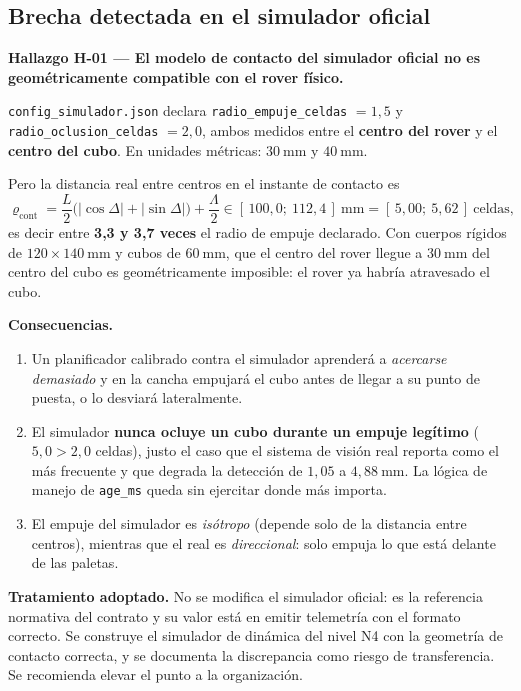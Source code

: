 \documentclass[11pt,a4paper]{article}
\begin{document}
\subsection{Brecha detectada en el simulador oficial}
\label{sec:brecha}

\begin{tcolorbox}[colback=black!5,colframe=black!65,boxrule=0.7pt,arc=1pt]
\textbf{Hallazgo H-01 --- El modelo de contacto del simulador oficial no es
geométricamente compatible con el rover físico.}

\medskip
\texttt{config\_simulador.json} declara \texttt{radio\_empuje\_celdas} $=1{,}5$ y
\texttt{radio\_oclusion\_celdas} $=2{,}0$, ambos medidos entre el \textbf{centro del
rover} y el \textbf{centro del cubo}. En unidades métricas: $30\ \mathrm{mm}$ y
$40\ \mathrm{mm}$.

Pero la distancia real entre centros en el instante de contacto es
\[
  \varrho_{\mathrm{cont}} = \frac{L}{2}\big(|\cos\Delta|+|\sin\Delta|\big) + \frac{\Lambda}{2}
  \in [\,100{,}0;\ 112{,}4\,]\ \mathrm{mm} = [\,5{,}00;\ 5{,}62\,]\ \text{celdas},
\]
es decir entre \textbf{3,3 y 3,7 veces} el radio de empuje declarado. Con cuerpos
rígidos de $120\times140\ \mathrm{mm}$ y cubos de $60\ \mathrm{mm}$, que el centro del
rover llegue a $30\ \mathrm{mm}$ del centro del cubo es geométricamente imposible: el
rover ya habría atravesado el cubo.

\medskip
\textbf{Consecuencias.}
\begin{enumerate}[label=(\alph*),leftmargin=2em,itemsep=1pt]
\item Un planificador calibrado contra el simulador aprenderá a \emph{acercarse
      demasiado} y en la cancha empujará el cubo antes de llegar a su punto de puesta,
      o lo desviará lateralmente.
\item El simulador \textbf{nunca ocluye un cubo durante un empuje legítimo}
      ($5{,}0 > 2{,}0$ celdas), justo el caso que el sistema de visión real reporta
      como el más frecuente y que degrada la detección de $1{,}05$ a
      $4{,}88\ \mathrm{mm}$. La lógica de manejo de \texttt{age\_ms} queda sin ejercitar
      donde más importa.
\item El empuje del simulador es \emph{isótropo} (depende solo de la distancia entre
      centros), mientras que el real es \emph{direccional}: solo empuja lo que está
      delante de las paletas.
\end{enumerate}

\medskip
\textbf{Tratamiento adoptado.} No se modifica el simulador oficial: es la referencia
normativa del contrato y su valor está en emitir telemetría con el formato correcto.
Se construye el simulador de dinámica del nivel N4 con la geometría de contacto
correcta, y se documenta la discrepancia como riesgo de transferencia. Se recomienda
elevar el punto a la organización.
\end{tcolorbox}
\end{document}
